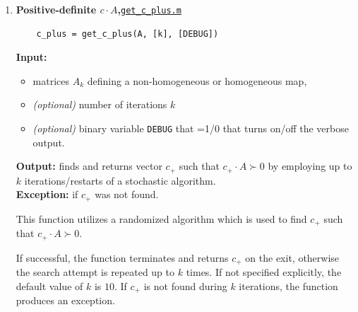 \documentclass[a4paper]{article}
\theoremstyle{definition}
\begin{document}
\begin{enumerate}
{\bf Exceptions:} None.

	
This function calls {\tt get\_c\_minus} and returns  {\tt is\_nonconvex}=$1$ if the latter returns a non-trivial $c$. 


\item {\bf Positive-definite $c\cdot A$,\hskip 6pt}\underline{\tt get\_c\_plus.m}
\begin{verbatim}
	c_plus = get_c_plus(A, [k], [DEBUG])
\end{verbatim}

{\bf Input:}
\begin{itemize}
	\item matrices $A_k$ defining a non-homogeneous or homogeneous map,
	\item {\it (optional)} number of iterations $k$
	\item {\it (optional)} binary variable {\tt DEBUG} that =1/0 that turns on/off the verbose output.
\end{itemize}
{\bf Output:} finds and returns vector $c_+$ such that $c_+\cdot A\succ 0$ by employing up to $k$ iterations/restarts of a stochastic algorithm.\\
{\bf Exception:} if $c_+$  was not found.
	
This function utilizes a randomized algorithm which is used to find $c_+$ such that $c_+\cdot A\succ 0$.

If successful, the function terminates and returns $c_+$ on the exit, otherwise the search attempt is repeated up to $k$ times.
If not specified explicitly, the default value of $k$ is $10$.
If $c_+$ is not found during $k$ iterations, the function produces an exception.

	

\end{enumerate}
\end{document}
